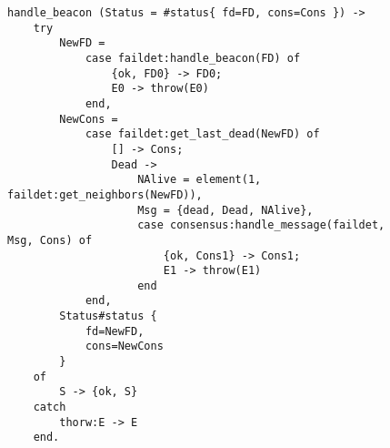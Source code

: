 \begin{itemize}
            \begin{figure}[hbt]
            \begin{lstlisting}[caption={Events from the \emph{Failure
                                        Detector}},
                               label={code:FromFaildet}]
handle_beacon (Status = #status{ fd=FD, cons=Cons }) ->
    try
        NewFD =
            case faildet:handle_beacon(FD) of
                {ok, FD0} -> FD0;
                E0 -> throw(E0)
            end,
        NewCons =
            case faildet:get_last_dead(NewFD) of
                [] -> Cons;
                Dead ->
                    NAlive = element(1, faildet:get_neighbors(NewFD)),
                    Msg = {dead, Dead, NAlive},
                    case consensus:handle_message(faildet, Msg, Cons) of
                        {ok, Cons1} -> Cons1;
                        E1 -> throw(E1)
                    end
            end,
        Status#status {
            fd=NewFD,
            cons=NewCons
        }
    of
        S -> {ok, S}
    catch
        thorw:E -> E
    end.
            \end{lstlisting}
            \end{figure}
 
\end{itemize}

